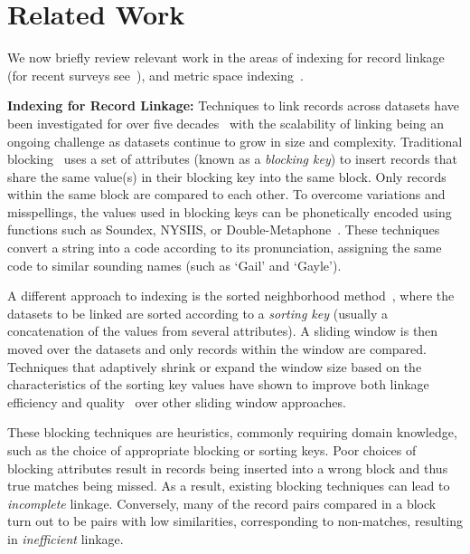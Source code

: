 \documentclass{llncs}
\begin{document}

\section{Related Work}
\label{sec-related}

We now briefly review relevant work in the areas of indexing
for record linkage (for recent surveys see~\cite{Chr12b,Pap16}),
and metric space indexing~\cite{Zezula2010}.

\smallskip
\textbf{Indexing for Record Linkage:}
Techniques to link records across datasets have been investigated for
over five decades~\cite{Fel69,New59} with the scalability of linking
being an ongoing challenge as datasets continue to grow in size and
complexity. Traditional blocking~\cite{Chr12b} uses a set of attributes
(known as a \emph{blocking key}) to insert records that share the same
value(s) in their blocking key into the same block. Only records within
the same block are  compared to each other. To overcome variations and
misspellings, the values used in blocking keys can be phonetically
encoded using functions such as Soundex, NYSIIS, or
Double-Metaphone~\cite{Chr12}. These techniques convert a string  into a
code according to its pronunciation, assigning the same code to similar
sounding names (such as `Gail' and `Gayle').

A different approach to indexing is the sorted neighborhood
method~\cite{Mon96}, where the datasets to be linked are sorted
according to a \emph{sorting key} (usually a concatenation of the values
from several attributes). A sliding window is then moved over the
datasets and only records within the window are compared. Techniques
that adaptively shrink or expand the window size based on the
characteristics of the sorting key values have shown to improve both
linkage efficiency and quality~\cite{Dra12} over other sliding window
approaches.

These blocking techniques are heuristics, commonly requiring domain
knowledge, such as the choice of appropriate blocking or sorting keys.
Poor choices of blocking attributes result in records being inserted
into a wrong block and thus true matches being missed. As a result,
existing blocking techniques can lead to \emph{incomplete} linkage.
Conversely, many of the record pairs compared in a block turn out to be
pairs with low similarities, corresponding to non-matches, resulting in
\emph{inefficient} linkage.
\end{document}
